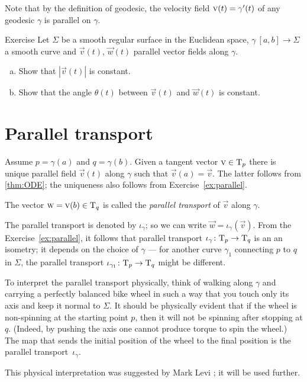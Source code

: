 Note that by the definition of geodesic, the velocity field ${\vec v}(t)\z=\gamma'(t)$ of any geodesic $\gamma$ is parallel on $\gamma$.

\begin{thm}{Exercise}\label{ex:parallel}
Let $\Sigma$ be a smooth regular surface in the Euclidean space, 
$\gamma\:[a,b]\to \Sigma$ a smooth curve 
and ${\vec v}(t)$, ${\vec w}(t)$ parallel vector fields along $\gamma$.
\begin{enumerate}[(a)]
 \item Show that $|{\vec v}(t)|$ is constant.
 \item Show that the angle $\theta(t)$ between ${\vec v}(t)$ and ${\vec w}(t)$ is constant.
\end{enumerate}
\end{thm}

\section*{Parallel transport}

Assume $p=\gamma(a)$ and $q=\gamma(b)$.
Given a tangent vector ${\textsc v}\in\mathrm{T}_p$ there is unique parallel field ${\vec v}(t)$ along $\gamma$ such that ${\vec v}(a)={\vec v}$.
The latter follows from \ref{thm:ODE}; the uniqueness also follows from Exercise~\ref{ex:parallel}.

The vector $\textsc w={\textsc v}(b)\in\mathrm{T}_q$ is called the \emph{parallel transport} of ${\vec v}$ along $\gamma$.

The parallel transport is denoted by $\iota_\gamma$;
so we can write $\vec w=\iota_\gamma({\vec v})$.
From the Exercise~\ref{ex:parallel}, it follows that parallel transport $\iota_\gamma\:\T_p\z\to\T_q$ is an an isometry;
it depends on the choice of $\gamma$ --- for another curve $\gamma_1$ connecting $p$ to $q$ in $\Sigma$, the parallel transport $\iota_{\gamma_1}\colon\mathrm{T}_p\to\mathrm{T}_q$ might be different.

To interpret the parallel transport physically, 
think of walking along $\gamma$ and carrying a perfectly balanced bike wheel in such a way that you touch only its axis and keep it normal to $\Sigma$.
It should be physically evident that if the wheel is non-spinning at the starting point $p$, then it will not be spinning after stopping at $q$.
(Indeed, by pushing the axis one cannot produce torque to spin the wheel.)
The map that sends the initial position of the wheel to the final position is  the parallel transport~$\iota_\gamma$.

This physical interpretation was suggested by Mark Levi \cite{levi};
it will be used further.

